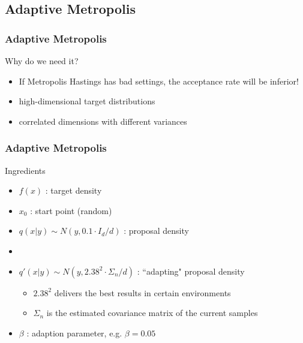  
\subsection{Adaptive Metropolis}
\begin{frame}
\frametitle{Adaptive Metropolis}
\begin{block}{Why do we need it?}
\begin{itemize}
\item If Metropolis Hastings has bad settings, the acceptance rate will be
inferior!
\item high-dimensional target distributions
\item correlated dimensions with different variances
\end{itemize}
\end{block}

\end{frame}


\begin{frame}
\frametitle{Adaptive Metropolis}

\begin{block}{Ingredients}
\begin{itemize}
\item $f(x)$ : target density
\item $x_0$ : start point (random)
\item $q(x|y)\sim N(y, 0.1\cdot I_d / d)$ : proposal density
\item[]
\item $q'(x|y) \sim N(y, 2.38^2\cdot \Sigma_n /
d)$ : ``adapting" proposal density
\begin{itemize}
  \item $2.38^2$ delivers the best results in certain environments
  \item $\Sigma_n$ is the estimated covariance matrix of the current samples 
\end{itemize}
\item $\beta$ : adaption parameter, e.g. $\beta = 0.05$ 
\end{itemize}
\end{block}

\end{frame}




